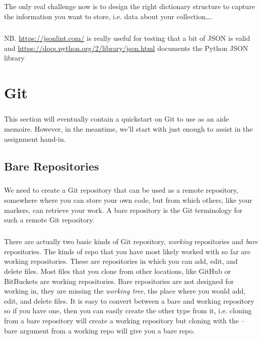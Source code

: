\documentclass[12pt, a4paper, oneside]{book}
\begin{document}
{\paragraph{} The only real challenge now is to design the right dictionary structure to capture the information you want to store, i.e. data about your collection….

\paragraph{} NB.   \url{https://jsonlint.com/} is really useful for testing that a bit of JSON is valid and \url{https://docs.python.org/2/library/json.html} documents the Python JSON library



\chapter{Git}
\label{git}

\paragraph{} This section will eventually contain a quickstart on Git to use as an aide memoire. However, in the meantime, we'll start with just enough to assist in the assignment hand-in.


\section{Bare Repositories}
\paragraph{} We need to create a Git repository that can be used as a remote repository, somewhere where you can store your own code, but from which others, like your markers, can retrieve your work. A bare repository is the Git terminology for such a remote Git repository. 

\paragraph{} There are actually two basic kinds of Git repository, \emph{working} repositories and \emph{bare} repositories. The kinds of repo that you have most likely worked with so far are working repositories. These are repositories in which you can add, edit, and delete files. Most files that you clone from other locations, like GitHub or BitBuckets are working repositories. Bare repositories are not designed for working in, they are missing the \emph{working tree}, the place where you would add, edit, and delete files. It is easy to convert between a bare and working repository so if you have one, then you can easily create the other type from it, i.e. cloning from a bare repository will create a working repository but cloning with the --bare argument from a working repo will give you a bare repo.

}
\end{document}
